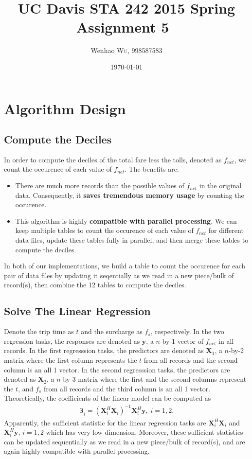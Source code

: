 \documentclass{article}
\title{UC Davis STA 242 2015 Spring Assignment 5~\cite{wu2015NYCTaxi}} %
\author{Wenhao \textsc{Wu}, 998587583} %
\date{\today} %
\begin{document}
\maketitle %


\section{Algorithm Design}

\subsection{Compute the Deciles}
In order to compute the deciles of the total fare less the tolls, denoted as
$f_{net}$, we count the occurence of each value of $f_{net}$. The benefits are:
\begin{itemize}
    \item There are much more records than the possible values of $f_{net}$ in
    the original data. Consequently, it \textbf{saves tremendous memory usage}
    by counting the occurence.
    \item This algorithm is highly \textbf{compatible with parallel processing}.
    We can keep multiple tables to count the occurence of each value of
    $f_{net}$ for different data files, update these tables fully in parallel, and
    then merge these tables to compute the deciles.
\end{itemize}
In both of our implementations, we build a table to count the occurence for
each pair of data files by updating it seqentially as we read in a new
piece/bulk of record(s), then combine the 12 tables to compute the deciles.

\subsection{Solve The Linear Regression}
Denote the trip time as $t$ and the surcharge as $f_s$, respectively. In the two
regression tasks, the responses are denoted as $\mathbf{y}$, a $n$-by-1 vector
of $f_{net}$ in all records. In the first regresssion tasks, the predictors are
denoted as $\mathbf{X}_1$, a $n$-by-2 matrix where the first column represents
the $t$ from all records and the second column is an all 1 vector. In the second
regresssion tasks, the predictors are denoted as $\mathbf{X}_2$, a $n$-by-3
matrix where the first and the second columns represent the $t$, and $f_s$ from
all records and the third column is an all 1 vector. Theoretically, the
coefficients of the linear model can be computed as
\begin{align}
    \bm{\beta}_i =
    (\mathbf{X}_i^H\mathbf{X}_i)^{-1}\mathbf{X}_i^H\mathbf{y},\;i=1,2.
    \label{eq:lm}
\end{align}
Apparently, the sufficient statistic for the linear regression tasks are
$\mathbf{X}_i^H\mathbf{X}_i$ and $\mathbf{X}_i^H\mathbf{y}$, $i=1,2$ which has
very low dimension. Moreover, these sufficient statistics can be updated
sequentially as we read in a new piece/bulk of record(s), and are again highly
compatible with parallel processing.
\end{document}
